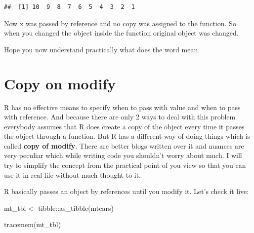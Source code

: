 \documentclass[
]{book}
\newenvironment{Shaded}{\begin{snugshade}}{\end{snugshade}}
\newcommand{\ControlFlowTok}[1]{\textcolor[rgb]{0.13,0.29,0.53}{\textbf{#1}}}
\newcommand{\DecValTok}[1]{\textcolor[rgb]{0.00,0.00,0.81}{#1}}
\newcommand{\FunctionTok}[1]{\textcolor[rgb]{0.00,0.00,0.00}{#1}}
\newcommand{\NormalTok}[1]{#1}
\newcommand{\OtherTok}[1]{\textcolor[rgb]{0.56,0.35,0.01}{#1}}
\newcommand{\SpecialCharTok}[1]{\textcolor[rgb]{0.00,0.00,0.00}{#1}}
\begin{document}
\begin{Shaded}
\end{Shaded}

\begin{verbatim}
##  [1] 10  9  8  7  6  5  4  3  2  1
\end{verbatim}

Now x was passed by reference and no copy was assigned to the function. So when you changed the object inside the function original object was changed.

Hope you now understand practically what does the word mean.

\hypertarget{copy-on-modify}{%
\section{Copy on modify}\label{copy-on-modify}}

R has no effective means to specify when to pass with value and when to pass with reference. And because there are only 2 ways to deal with this problem everybody assumes that R does create a copy of the object every time it passes the object through a function. But R has a different way of doing things which is called \textbf{copy of modify}. There are better blogs written over it and nuances are very peculiar which while writing code you shouldn't worry about much. I will try to simplify the concept from the practical point of you view so that you can use it in real life without much thought to it.

R basically passes an object by references until you modify it. Let's check it live:

\begin{Shaded}
\begin{Highlighting}[]
\NormalTok{mt\_tbl }\OtherTok{\textless{}{-}}\NormalTok{ tibble}\SpecialCharTok{::}\FunctionTok{as\_tibble}\NormalTok{(mtcars)}

\FunctionTok{tracemem}\NormalTok{(mt\_tbl)}
\end{Highlighting}
\end{Shaded}
\end{document}
